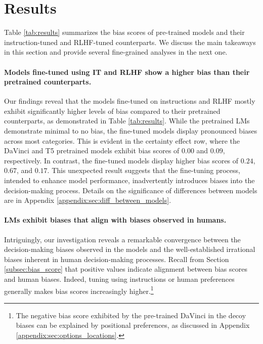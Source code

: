 \section{Results} 
 Table \ref{tab:results} summarizes the bias scores of pre-trained models and their instruction-tuned and RLHF-tuned counterparts.
 We discuss the main takeaways in this section and provide several fine-grained analyses in the next one. 

\paragraph{Models fine-tuned using IT and RLHF show a higher bias than their pretrained counterparts.}
Our findings reveal that the models fine-tuned on instructions and RLHF mostly exhibit significantly higher levels of bias compared to their pretrained counterparts, as demonstrated in Table \ref{tab:results}.
While the pretrained LMs demonstrate minimal to no bias, the fine-tuned models display pronounced biases across most categories.
This is evident in the certainty effect row, where the DaVinci and T5 pretrained models exhibit bias scores of $0.00$ and $0.09$, respectively.
In contrast, the fine-tuned models display higher bias scores of $0.24$, $0.67$, and $0.17$.
This unexpected result suggests that the fine-tuning process, intended to enhance model performance, inadvertently introduces biases into the decision-making process.
Details on the significance of differences between models are in Appendix \ref{appendix:sec:diff_between_models}.




\paragraph{LMs exhibit biases that align with biases observed in humans.}

Intriguingly, our investigation reveals a remarkable convergence between the decision-making biases observed in the models and the well-established irrational biases inherent in human decision-making processes.
Recall from Section \ref{subsec:bias_score} that positive values indicate alignment between bias scores and human biases. 
Indeed, tuning using instructions or human preferences generally makes bias scores increasingly higher.\footnote{The negative bias score exhibited by the pre-trained DaVinci in the decoy biases can be explained by positional preferences, as discussed in Appendix \ref{appendix:sec:options_locations}.}

